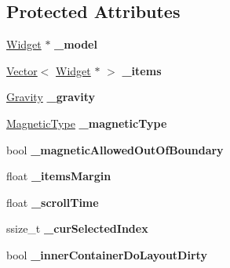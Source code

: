 \subsection*{Protected Attributes}
\begin{DoxyCompactItemize}
\item 
\mbox{\label{classui_1_1ListView_abc8489c13364ce87111b53fb89deb166}} 
\hyperlink{classui_1_1Widget}{Widget} $\ast$ {\bfseries \+\_\+model}
\item 
\mbox{\label{classui_1_1ListView_a9993b2ce6ef3f816ee0be076371fbcde}} 
\hyperlink{classVector}{Vector}$<$ \hyperlink{classui_1_1Widget}{Widget} $\ast$ $>$ {\bfseries \+\_\+items}
\item 
\mbox{\label{classui_1_1ListView_ad6f3b66fe72d0dfa7eb358eec179bc15}} 
\hyperlink{classui_1_1ListView_af79b44631b38c1782c384830acf20cf6}{Gravity} {\bfseries \+\_\+gravity}
\item 
\mbox{\label{classui_1_1ListView_a1f6c3bbafa27df6194046fffec2a9d0b}} 
\hyperlink{classui_1_1ListView_a143593e762b785241572552b060aed6f}{Magnetic\+Type} {\bfseries \+\_\+magnetic\+Type}
\item 
\mbox{\label{classui_1_1ListView_a02302523514dc9d7b96debc0d7bf21aa}} 
bool {\bfseries \+\_\+magnetic\+Allowed\+Out\+Of\+Boundary}
\item 
\mbox{\label{classui_1_1ListView_a0c87bc91c5fff743e16d3878662cbffe}} 
float {\bfseries \+\_\+items\+Margin}
\item 
\mbox{\label{classui_1_1ListView_a92c1621a22fbf8446cb0625cbca27152}} 
float {\bfseries \+\_\+scroll\+Time}
\item 
\mbox{\label{classui_1_1ListView_a9ee2e49c644567175d376d49eac6c5da}} 
ssize\+\_\+t {\bfseries \+\_\+cur\+Selected\+Index}
\item 
\mbox{\label{classui_1_1ListView_a5b534a43515710fa1ecf7d8d4a47e13e}} 
bool {\bfseries \+\_\+inner\+Container\+Do\+Layout\+Dirty}
\item 

\end{DoxyCompactItemize}
